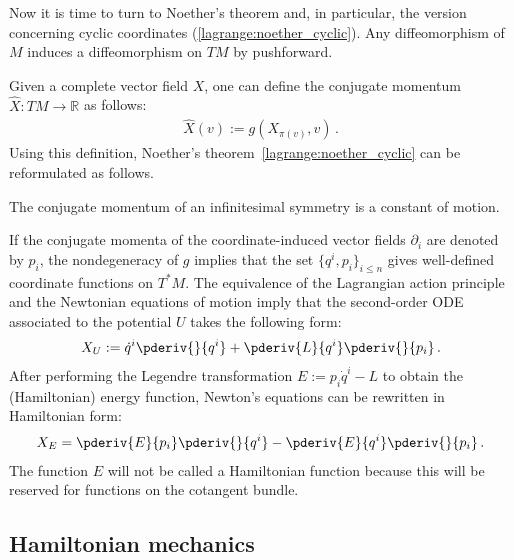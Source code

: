     Now it is time to turn to Noether's theorem and, in particular, the version concerning cyclic coordinates (\cref{lagrange:noether_cyclic}). Any diffeomorphism of $M$ induces a diffeomorphism on $TM$ by pushforward.

    Given a complete vector field $X$, one can define the conjugate momentum $\widehat{X}:TM\rightarrow\mathbb{R}$ as follows:
    \begin{gather}
        \label{lagrange:metric_conjugate_momentum}
        \widehat{X}(v) := g(X_{\pi(v)},v)\,.
    \end{gather}
    Using this definition, Noether's theorem~\ref{lagrange:noether_cyclic} can be reformulated as follows.
    \begin{theorem}
        The conjugate momentum of an infinitesimal symmetry is a constant of motion.
    \end{theorem}

    If the conjugate momenta of the coordinate-induced vector fields $\partial_i$ are denoted by $p_i$, the nondegeneracy of $g$ implies that the set $\{q^i,p_i\}_{i\leq n}$ gives well-defined coordinate functions on $T^*M$. The equivalence of the Lagrangian action principle and the Newtonian equations of motion imply that the second-order ODE associated to the potential $U$ takes the following form:
    \begin{gather}
        X_U := \dot{q}^i\pderiv{}{q^i} + \pderiv{L}{q^i}\pderiv{}{p_i}\,.
    \end{gather}
    After performing the Legendre transformation $E:=p_i\dot{q}^i-L$ to obtain the (Hamiltonian) energy function, Newton's equations can be rewritten in Hamiltonian form:
    \begin{gather}
        X_E = \pderiv{E}{p_i}\pderiv{}{q^i}-\pderiv{E}{q^i}\pderiv{}{p_i}\,.
    \end{gather}
    The function $E$ will not be called a Hamiltonian function because this will be reserved for functions on the cotangent bundle.

\subsection{Hamiltonian mechanics}

